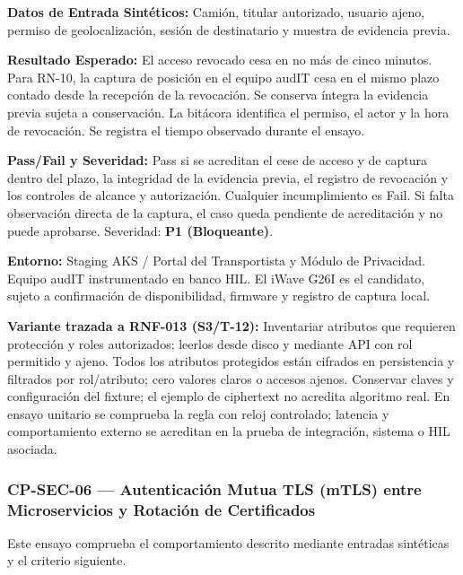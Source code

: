 \par\noindent\textbf{Datos de Entrada Sintéticos:} Camión, titular autorizado, usuario ajeno, permiso de geolocalización, sesión de destinatario y muestra de evidencia previa.\par
\par\noindent\textbf{Resultado Esperado:} El acceso revocado cesa en no más de cinco minutos. Para RN-10, la captura de posición en el equipo audIT cesa en el mismo plazo contado desde la recepción de la revocación. Se conserva íntegra la evidencia previa sujeta a conservación. La bitácora identifica el permiso, el actor y la hora de revocación. Se registra el tiempo observado durante el ensayo.\par
\par\noindent\textbf{Pass/Fail y Severidad:} Pass si se acreditan el cese de acceso y de captura dentro del plazo, la integridad de la evidencia previa, el registro de revocación y los controles de alcance y autorización. Cualquier incumplimiento es Fail. Si falta observación directa de la captura, el caso queda pendiente de acreditación y no puede aprobarse. Severidad: \textbf{P1 (Bloqueante)}.\par
\par\noindent\textbf{Entorno:} Staging AKS / Portal del Transportista y Módulo de Privacidad. Equipo audIT instrumentado en banco HIL. El iWave G26I es el candidato, sujeto a confirmación de disponibilidad, firmware y registro de captura local.\par

\par\noindent\textbf{Variante trazada a RNF-013 (S3/T-12):} Inventariar atributos que requieren protección y roles autorizados; leerlos desde disco y mediante API con rol permitido y ajeno. Todos los atributos protegidos están cifrados en persistencia y filtrados por rol/atributo; cero valores claros o accesos ajenos. Conservar claves y configuración del fixture; el ejemplo de ciphertext no acredita algoritmo real. En ensayo unitario se comprueba la regla con reloj controlado; latencia y comportamiento externo se acreditan en la prueba de integración, sistema o HIL asociada.\par
\subsubsection*{CP-SEC-06 — Autenticación Mutua TLS (mTLS) entre Microservicios y Rotación de Certificados}\label{sec:9-cp-sec-06}
Este ensayo comprueba el comportamiento descrito mediante entradas sintéticas y el criterio siguiente.

